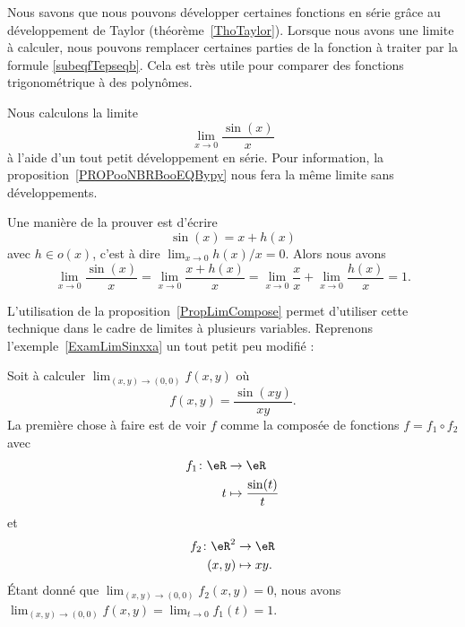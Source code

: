 Nous savons  que nous pouvons développer certaines fonctions en série grâce au développement de Taylor (théorème~\ref{ThoTaylor}). Lorsque nous avons une limite à calculer, nous pouvons remplacer certaines parties de la fonction à traiter par la formule \eqref{subeqfTepseqb}. Cela est très utile pour comparer des fonctions trigonométrique à des polynômes.

\begin{example}		\label{ExamLimSinxxa}
    Nous calculons la limite
    \begin{equation}
        \lim_{x\to 0} \frac{ \sin(x) }{ x }
    \end{equation}
    à l'aide d'un tout petit développement en série. Pour information, la proposition~\ref{PROPooNBRBooEQBypy} nous fera la même limite sans développements.

    Une manière de la prouver est d'écrire
    \begin{equation}
		\sin(x)=x+h(x)
	\end{equation}
	avec $h\in o(x)$, c'est à dire $\lim_{x\to 0} h(x)/x=0$. Alors nous avons
	\begin{equation}
		\lim_{x\to 0} \frac{ \sin(x) }{ x }=\lim_{x\to 0} \frac{ x+h(x) }{ x }=\lim_{x\to 0} \frac{ x }{ x }+\lim_{x\to 0} \frac{ h(x) }{ x }=1.
	\end{equation}
\end{example}

L'utilisation de la proposition~\ref{PropLimCompose} permet d'utiliser cette technique dans le cadre de limites à plusieurs variables. Reprenons l'exemple~\ref{ExamLimSinxxa} un tout petit peu modifié :

\begin{example}
	Soit à calculer $\lim_{(x,y)\to(0,0)}f(x,y)$ où
	\begin{equation}
		f(x,y)=\frac{ \sin(xy) }{ xy }.
	\end{equation}
	La première chose à faire est de voir $f$ comme la composée de fonctions $f=f_1\circ f_2$ avec
	\begin{equation}
		\begin{aligned}
			f_1\colon \eR&\to \eR \\
			t&\mapsto \frac{ \sin(t) }{ t }
		\end{aligned}
	\end{equation}
	et
	\begin{equation}
		\begin{aligned}
			f_2\colon \eR^2&\to \eR \\
			(x,y)&\mapsto xy.
		\end{aligned}
	\end{equation}
	Étant donné que $\lim_{(x,y)\to(0,0)}f_2(x,y)=0$, nous avons $\lim_{(x,y)\to(0,0)}f(x,y)=\lim_{t\to 0} f_1(t)=1$.
\end{example}

